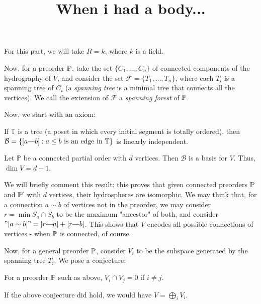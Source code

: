
\title{When i had a body...}

	\maketitle
	\par For this part, we will take $R = k$, where $k$ is a field.
	\begin{definition}
		 Now, for a preorder $\mathbb{P}$, take the set $\{C_1, \dots, C_n\}$ of connected components of the hydrography of $V$, and consider the set $\mathcal{F} = \{T_1, \dots, T_n\}$, where each $T_i$ is a spanning tree of $C_i$ (a \textit{spanning tree} is a minimal tree that connects all the vertices).  We call the extension of $\mathcal{F}$ a \textit{spanning forest} of $\mathbb{P}$.
	\end{definition}
	Now, we start with an axiom:
	\begin{mata}
		If $\mathbb{T}$ is a tree (a poset in which every initial segment is totally ordered), then $\mathcal{B} = \{[a \connect b]: a \leq b \text{ is an edge in } \mathbb{T}\}$ is linearly independent.
	\end{mata}

	\begin{cor}
		Let $\mathbb{P}$ be a connected partial order with $d$ vertices. Then $\mathcal{B}$ is a basis for $V$. Thus, $\dim V = d - 1$.
	\end{cor}
	\par We will briefly comment this result: this proves that given connected preorders $\mathbb{P}$ and $\mathbb{P}'$ with $d$ vertices, their hydrospheres are isomorphic. We may think that, for a connection $a \sim b$ of vertices not in the preorder, we may consider $r = \min S_a \cap S_b$ to be the maximum "ancestor" of both, and consider $"[a \sim b]" = [r \connect a] + [r \connect b]$. This shows that $V$ encodes all possible connections of vertices - when $\mathbb{P}$ is connected, of course.
	\par Now, for a general preorder $\mathbb{P}$, consider $V_i$ to be the subspace generated by the spanning tree $T_i$. We pose a conjecture:
	\begin{conj}
		For a preorder $\mathbb{P}$ such as above, $V_i \cap V_j = 0$ if $i \neq j$.
	\end{conj}
	If the above conjecture did hold, we would have $V = \bigoplus_i V_i$.

